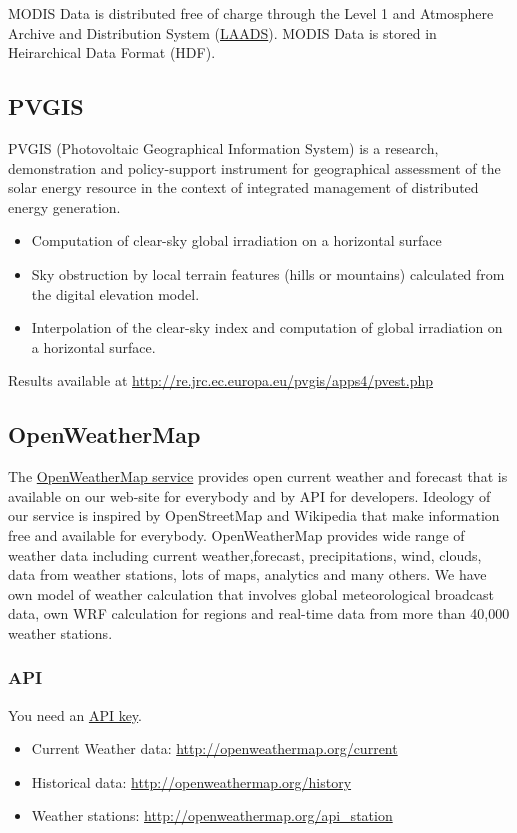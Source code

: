 \documentclass[11pt]{article}
\begin{document}
MODIS Data is distributed free of charge through the Level 1 and
Atmosphere Archive and Distribution System (\href{http://ladsweb.nascom.nasa.gov/data/search.html}{LAADS}). MODIS Data is
stored in Heirarchical Data Format (HDF).

\subsection{PVGIS}
\label{sec-1-10}

PVGIS (Photovoltaic Geographical Information System) is a research,
demonstration and policy-support instrument for geographical
assessment of the solar energy resource in the context of integrated
management of distributed energy generation.
\begin{itemize}
\item Computation of clear-sky global irradiation on a horizontal surface
\item Sky obstruction by local terrain features (hills or mountains)
calculated from the digital elevation model.
\item Interpolation of the clear-sky index and computation of global
irradiation on a horizontal surface.
\end{itemize}

Results available at \url{http://re.jrc.ec.europa.eu/pvgis/apps4/pvest.php}

\subsection{OpenWeatherMap}
\label{sec-1-11}

The \href{http://openweathermap.org/}{OpenWeatherMap service} provides open current weather and forecast
that is available on our web-site for everybody and by API for
developers. Ideology of our service is inspired by OpenStreetMap and
Wikipedia that make information free and available for
everybody. OpenWeatherMap provides wide range of weather data
including current weather,forecast, precipitations, wind, clouds, data
from weather stations, lots of maps, analytics and many others. We
have own model of weather calculation that involves global
meteorological broadcast data, own WRF calculation for regions and
real-time data from more than 40,000 weather stations.

\subsubsection{API}
\label{sec-1-11-1}
You need an \href{http://openweathermap.org/appid}{API key}.
\begin{itemize}
\item Current Weather data: \url{http://openweathermap.org/current}
\item Historical data: \url{http://openweathermap.org/history}
\item Weather stations: \url{http://openweathermap.org/api_station}
\end{itemize}
\end{document}
